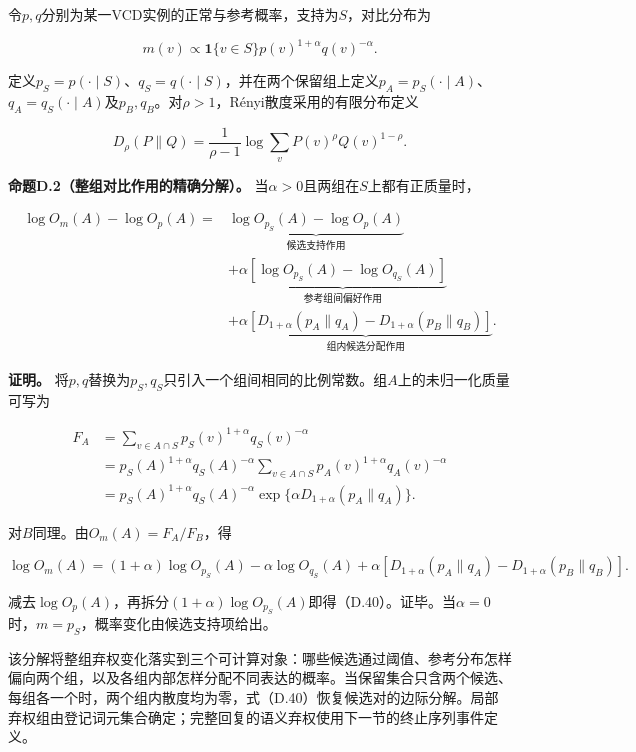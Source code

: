 令\(p,q\)分别为某一VCD实例的正常与参考概率，支持为\(S\)，对比分布为

\[
m(v)\propto\mathbf1\{v\in S\}p(v)^{1+\alpha}q(v)^{-\alpha}.
\tag{D.38}
\]

定义\(p_S=p(\cdot\mid S)\)、\(q_S=q(\cdot\mid S)\)，并在两个保留组上定义\(p_A=p_S(\cdot\mid A)\)、\(q_A=q_S(\cdot\mid A)\)及\(p_B,q_B\)。对\(\rho>1\)，Rényi散度采用\citep{vanerven2014renyi}的有限分布定义

\[
D_\rho(P\|Q)=\frac{1}{\rho-1}\log\sum_v P(v)^\rho Q(v)^{1-\rho}.
\tag{D.39}
\]

\textbf{命题D.2（整组对比作用的精确分解）。} 当\(\alpha>0\)且两组在\(S\)上都有正质量时，

\[
\boxed{
\begin{aligned}
\log O_m(A)-\log O_p(A)
={}&\underbrace{\log O_{p_S}(A)-\log O_p(A)}_{\text{候选支持作用}}\\
&+\underbrace{\alpha[\log O_{p_S}(A)-\log O_{q_S}(A)]}_{\text{参考组间偏好作用}}\\
&+\underbrace{\alpha[D_{1+\alpha}(p_A\|q_A)-D_{1+\alpha}(p_B\|q_B)]}_{\text{组内候选分配作用}}.
\end{aligned}}
\tag{D.40}
\]

\textbf{证明。} 将\(p,q\)替换为\(p_S,q_S\)只引入一个组间相同的比例常数。组\(A\)上的未归一化质量可写为

\[
\begin{aligned}
F_A
&=\sum_{v\in A\cap S}p_S(v)^{1+\alpha}q_S(v)^{-\alpha}\\
&=p_S(A)^{1+\alpha}q_S(A)^{-\alpha}
\sum_{v\in A\cap S}p_A(v)^{1+\alpha}q_A(v)^{-\alpha}\\
&=p_S(A)^{1+\alpha}q_S(A)^{-\alpha}
\exp\{\alpha D_{1+\alpha}(p_A\|q_A)\}.
\end{aligned}
\tag{D.41}
\]

对\(B\)同理。由\(O_m(A)=F_A/F_B\)，得

\[
\log O_m(A)
=(1+\alpha)\log O_{p_S}(A)-\alpha\log O_{q_S}(A)
+\alpha[D_{1+\alpha}(p_A\|q_A)-D_{1+\alpha}(p_B\|q_B)].
\]

减去\(\log O_p(A)\)，再拆分\((1+\alpha)\log O_{p_S}(A)\)即得（D.40）。证毕。当\(\alpha=0\)时，\(m=p_S\)，概率变化由候选支持项给出。

该分解将整组弃权变化落实到三个可计算对象：哪些候选通过阈值、参考分布怎样偏向两个组，以及各组内部怎样分配不同表达的概率。当保留集合只含两个候选、每组各一个时，两个组内散度均为零，式（D.40）恢复候选对的边际分解。局部弃权组由登记词元集合确定；完整回复的语义弃权使用下一节的终止序列事件定义。

